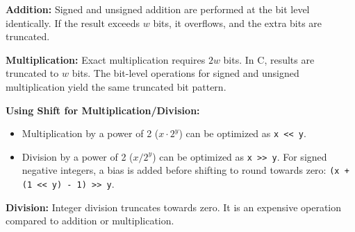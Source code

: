 \begin{lemma}
    \textbf{Addition:} Signed and unsigned addition are performed at the bit
    level identically. If the result exceeds $w$ bits, it overflows, and the
    extra bits are truncated.
\end{lemma}

\begin{lemma}
    \textbf{Multiplication:} Exact multiplication requires $2w$ bits. In C,
    results are truncated to $w$ bits. The bit-level operations for signed and
    unsigned multiplication yield the same truncated bit pattern.
\end{lemma}

\begin{remark}
    \textbf{Using Shift for Multiplication/Division:}
    \begin{itemize}
        \item Multiplication by a power of 2 ($x \cdot 2^y$) can be optimized as
        \verb|x << y|.
        \item Division by a power of 2 ($x / 2^y$) can be optimized as
        \verb|x >> y|. For signed negative integers, a bias is added
        before shifting to round towards zero:
        \verb|(x + (1 << y) - 1) >> y|.
    \end{itemize}
\end{remark}

\begin{lemma}
    \textbf{Division:} Integer division truncates towards zero. It is an
    expensive operation compared to addition or multiplication.
\end{lemma}
